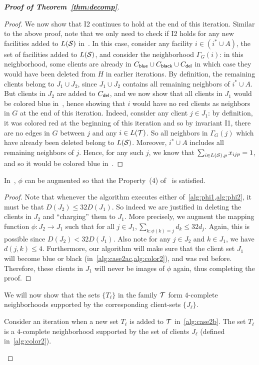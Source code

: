 \begin{proof}[{\bf Proof of Theorem~\ref{thm:decomp}}]
\begin{proof}
\medskip \noindent We now show that I2 continues to hold at the end of this iteration. Similar to the above proof, note that we only need to check if I2 holds for any new facilities added to $L({\cal S})$ in~. In this case, consider any facility $i \in (i^* \cup A)$, the set of facilities added to $L({\cal S})$, and consider the neighborhood $\Gamma_G(i)$: in this neighborhood, some clients are already in $C_{\mathsf{blue}} \cup C_{\mathsf{black}} \cup C_{\mathsf{del}}$ in which case they would have been deleted from $H$ in earlier iterations. By definition, the remaining clients belong to $J_1 \cup J_2$, since $J_1 \cup J_2$ contains all remaining neighbors of $i^* \cup A$. But clients in $J_2$ are added to $C_{\mathsf{del}}$, and we now show that all clients in $J_1$ would be colored blue in~, hence showing that $i$ would have no red clients as neighbors in $G$ at the end of this iteration.
Indeed, consider any client $j \in J_1$: by definition, it was colored red at the beginning of this iteration and so by invariant I1, there are no edges in $G$ between $j$ and any $i \in L({\cal T})$. So all neighbors in $\Gamma_G(j)$ which have already been deleted belong to $L({\cal S})$. Moreover, $i^* \cup A$ includes all remaining neighbors of $j$. Hence, for any such $j$, we know that $\sum_{i \in L({\cal S}), p} x_{ijp} = 1$, and so it would be colored blue in~.
\end{proof}


\begin{claim} \label{cl:phi-augment}
In~, $\phi$ can be augmented so that the Property~(4) of~ is satisfied.
\end{claim}
\begin{proof}
Note that whenever the algorithm executes either of~\cref{alg:phi1,alg:phi2}, it must be that $D(J_2) \leq 32 D(J_1)$. So indeed we are justified in deleting the clients in $J_2$ and ``charging'' them to $J_1$. More precisely, we augment the
mapping function $\phi:J_2 \to J_1$ such that for all $j\in J_1, \sum_{k:\phi(k) = j} d_k \leq 32d_j$. Again, this is possible since $D(J_2) < 32D(J_1)$. Also note for any $j\in J_2$ and $k\in J_1$,
we have $d(j,k) \leq 4$.
Furthermore, our algorithm will make sure that the client set $J_1$ will become blue or black (in~\cref{alg:case2ac,alg:color2}), and was red before.
Therefore, these clients in $J_1$ will never be images of $\phi$ again, thus completing the proof.
\end{proof}


We will now show that the sets $\{T_\ell\}$ in the family ${\cal T}$ form $4$-complete neighborhoods supported by the corresponding client-sets $\{J_\ell\}$.
\begin{lemma} \label{lem:local}
Consider an iteration when a new set $T_\ell$ is added to ${\cal T}$ in~\cref{alg:case2b}. The set $T_\ell$ is a $4$-complete neighborhood supported by the set of clients $J_\ell$ (defined in~\cref{alg:color2}).
\end{lemma}


\end{proof}
